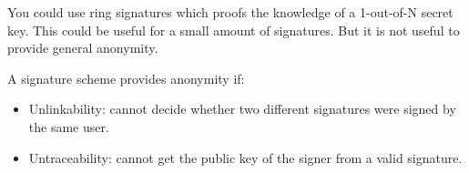 You could use ring signatures which proofs the knowledge of a 1-out-of-N secret key. This could be useful for a small amount of signatures. But it is not useful to provide general anonymity.

A signature scheme provides anonymity if:
\begin{itemize}
    \item Unlinkability: cannot decide whether two different signatures were signed by the same user.
    \item Untraceability: cannot get the public key of the signer from a valid signature.
\end{itemize}